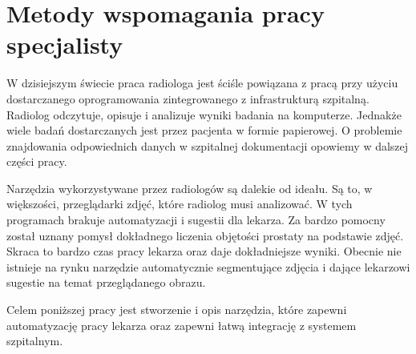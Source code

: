 \documentclass[a4paper,11pt,twoside]{report}
\theoremstyle{definition}
\begin{document}
\section{Metody wspomagania pracy specjalisty}
W dzisiejszym świecie praca radiologa jest ściśle powiązana z pracą przy użyciu dostarczanego oprogramowania zintegrowanego z infrastrukturą szpitalną. Radiolog odczytuje, opisuje i analizuje wyniki badania na komputerze. Jednakże wiele badań dostarczanych jest przez pacjenta w formie papierowej. O problemie znajdowania odpowiednich danych w szpitalnej dokumentacji opowiemy w dalszej części pracy. 
\par

Narzędzia wykorzystywane przez radiologów są dalekie od ideału. Są to, w większości, przeglądarki zdjęć, które radiolog musi analizować. W tych programach brakuje automatyzacji i sugestii dla lekarza. Za bardzo pomocny został uznany pomysł dokładnego liczenia objętości prostaty na podstawie zdjęć. Skraca to bardzo czas pracy lekarza oraz daje dokładniejsze wyniki. Obecnie nie istnieje na rynku narzędzie automatycznie segmentujące zdjęcia i dające lekarzowi sugestie na temat przeglądanego obrazu.
\par
Celem poniższej pracy jest stworzenie i opis narzędzia, które zapewni automatyzację pracy lekarza oraz zapewni łatwą integrację z systemem szpitalnym.
\end{document}

